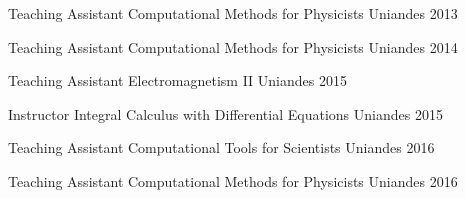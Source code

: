 


\begin{cvhonors}


\cvhonor
{Teaching Assistant} %
{Computational Methods for Physicists} %
{Uniandes} %
{2013} %

\cvhonor
{Teaching Assistant} %
{Computational Methods for Physicists} %
{Uniandes} %
{2014} %

\cvhonor
{Teaching Assistant} %
{Electromagnetism II} %
{Uniandes} %
{2015} %

\cvhonor
{Instructor} %
{Integral Calculus with Differential Equations} %
{Uniandes} %
{2015} %

\cvhonor
{Teaching Assistant} %
{Computational Tools for Scientists} %
{Uniandes} %
{2016} %

\cvhonor
{Teaching Assistant} %
{Computational Methods for Physicists} %
{Uniandes} %
{2016} %

\end{cvhonors}
